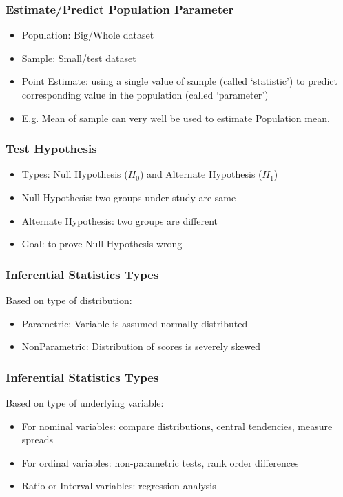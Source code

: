 \begin{frame}[fragile]\frametitle{Estimate/Predict Population Parameter}
\begin{itemize}
\item Population: Big/Whole dataset
\item Sample: Small/test dataset
\item Point Estimate: using a single value of sample (called `statistic') to predict corresponding value in the population (called `parameter')
\item E.g. Mean of sample can very well be used to estimate Population mean.
\end{itemize}
\end{frame}


\begin{frame}[fragile]\frametitle{Test Hypothesis}
\begin{itemize}
\item Types: Null Hypothesis ($H_0$) and Alternate Hypothesis ($H_1$)
\item Null Hypothesis: two groups under study are same
\item Alternate Hypothesis: two groups are different
\item Goal: to prove Null Hypothesis wrong
\end{itemize}
\end{frame}



\begin{frame}[fragile]\frametitle{Inferential Statistics Types}
Based on type of distribution:
\begin{itemize}
\item Parametric: Variable is assumed normally distributed
\item NonParametric: Distribution of scores is severely skewed
\end{itemize}
\end{frame}

\begin{frame}[fragile]\frametitle{Inferential Statistics Types}
Based on type of underlying variable:
\begin{itemize}
\item For nominal variables: compare distributions, central tendencies, measure spreads
\item For ordinal variables: non-parametric tests, rank order differences
\item Ratio or Interval variables: regression analysis
\end{itemize}
\end{frame}


